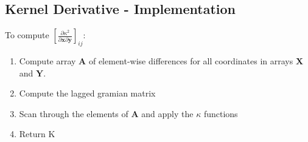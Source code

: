 \documentclass[12pt, a4paper]{article}
\begin{document}
\subsection{Kernel Derivative - Implementation}
To compute $\left[\frac{\partial \kappa^2}{\partial \mathbf{x} \partial \mathbf{y}}\right]_{ij}$:
\begin{enumerate}
    \item Compute array $\mathbf{A}$ of element-wise differences for all coordinates in arrays $\mathbf{X}$ and $\mathbf{Y}$.
    \item Compute the lagged gramian matrix
    \item Scan through the elements of $\mathbf{A}$ and apply the $\kappa$ functions
    \item Return K
\end{enumerate}
\end{document}

